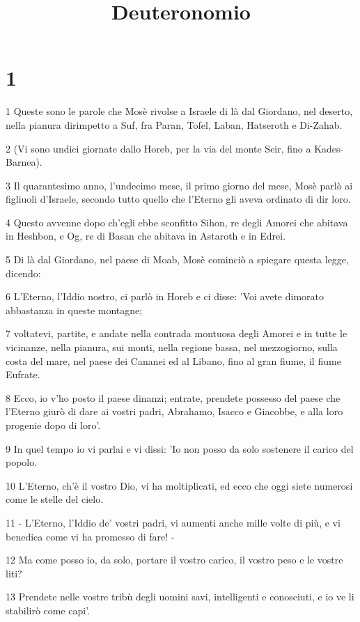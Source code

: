 

\title{Deuteronomio}


\chapter{1}

\par 1 Queste sono le parole che Mosè rivolse a Israele di là dal Giordano, nel deserto, nella pianura dirimpetto a Suf, fra Paran, Tofel, Laban, Hatseroth e Di-Zahab.
\par 2 (Vi sono undici giornate dallo Horeb, per la via del monte Seir, fino a Kades-Barnea).
\par 3 Il quarantesimo anno, l'undecimo mese, il primo giorno del mese, Mosè parlò ai figliuoli d'Israele, secondo tutto quello che l'Eterno gli aveva ordinato di dir loro.
\par 4 Questo avvenne dopo ch'egli ebbe sconfitto Sihon, re degli Amorei che abitava in Heshbon, e Og, re di Basan che abitava in Astaroth e in Edrei.
\par 5 Di là dal Giordano, nel paese di Moab, Mosè cominciò a spiegare questa legge, dicendo:
\par 6 L'Eterno, l'Iddio nostro, ci parlò in Horeb e ci disse: 'Voi avete dimorato abbastanza in queste montagne;
\par 7 voltatevi, partite, e andate nella contrada montuosa degli Amorei e in tutte le vicinanze, nella pianura, sui monti, nella regione bassa, nel mezzogiorno, sulla costa del mare, nel paese dei Cananei ed al Libano, fino al gran fiume, il fiume Eufrate.
\par 8 Ecco, io v'ho posto il paese dinanzi; entrate, prendete possesso del paese che l'Eterno giurò di dare ai vostri padri, Abrahamo, Isacco e Giacobbe, e alla loro progenie dopo di loro'.
\par 9 In quel tempo io vi parlai e vi dissi: 'Io non posso da solo sostenere il carico del popolo.
\par 10 L'Eterno, ch'è il vostro Dio, vi ha moltiplicati, ed ecco che oggi siete numerosi come le stelle del cielo.
\par 11 - L'Eterno, l'Iddio de' vostri padri, vi aumenti anche mille volte di più, e vi benedica come vi ha promesso di fare! -
\par 12 Ma come posso io, da solo, portare il vostro carico, il vostro peso e le vostre liti?
\par 13 Prendete nelle vostre tribù degli uomini savi, intelligenti e conosciuti, e io ve li stabilirò come capi'.
